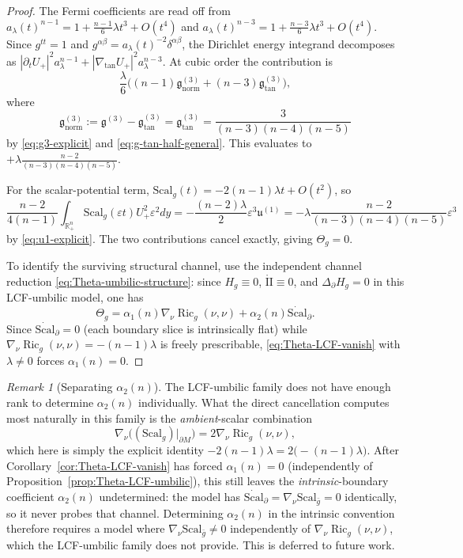 \documentclass[11pt,reqno,a4paper]{amsart}
\newcommand{\R}{\mathbb{R}}
\DeclareMathOperator{\Ric}{Ric}
\numberwithin{equation}{section}
\theoremstyle{plain}
\newcommand{\Scal}{\mathrm{Scal}}
\theoremstyle{remark}
\newtheorem{remark}[theorem]{Remark}
\theoremstyle{plain}
\begin{document}
\begin{proof}
The Fermi coefficients are read off from
$a_\lambda(t)^{n-1}=1+\frac{n-1}{6}\lambda t^3+O(t^4)$ and
$a_\lambda(t)^{n-3}=1+\frac{n-3}{6}\lambda t^3+O(t^4)$.
Since $g^{tt}=1$ and $g^{\alpha\beta}=a_\lambda(t)^{-2}\delta^{\alpha\beta}$,
the Dirichlet energy integrand decomposes as
$|\partial_t U_+|^2 a_\lambda^{n-1}+|\nabla_{\tan}U_+|^2 a_\lambda^{n-3}$.
At cubic order the contribution is
\[
\frac{\lambda}{6}\Big((n-1)\mathfrak g^{(3)}_{\mathrm{norm}}+(n-3)\mathfrak g^{(3)}_{\tan}\Big),
\]
where
\[
\mathfrak g^{(3)}_{\mathrm{norm}}:=\mathfrak g^{(3)}-\mathfrak g^{(3)}_{\tan}=\mathfrak g^{(3)}_{\tan}=\frac{3}{(n-3)(n-4)(n-5)}
\]
by \eqref{eq:g3-explicit} and \eqref{eq:g-tan-half-general}. This evaluates to
$+\lambda\frac{n-2}{(n-3)(n-4)(n-5)}$.

For the scalar-potential term, $\Scal_g(t)=-2(n-1)\lambda t+O(t^2)$, so
\[
\frac{n-2}{4(n-1)}\int_{\R^n_+}\Scal_g(\varepsilon t)U_+^2\varepsilon^{2}dy
=
-\frac{(n-2)\lambda}{2}\varepsilon^3\mathfrak u^{(1)}
=
-\lambda\frac{n-2}{(n-3)(n-4)(n-5)}\varepsilon^3
\]
by \eqref{eq:u1-explicit}. The two contributions cancel exactly, giving $\Theta_g=0$.

To identify the surviving structural channel, use the independent channel
reduction \eqref{eq:Theta-umbilic-structure}: since
$H_g\equiv0$, $\mathring{\mathrm{II}}\equiv0$, and $\Delta_\partial H_g=0$
in this LCF-umbilic model, one has
\[
\Theta_g=\alpha_1(n)\nabla_\nu\Ric_g(\nu,\nu)+\alpha_2(n)\dot{\Scal}_\partial.
\]
Since $\dot{\Scal}_\partial=0$ (each boundary slice is intrinsically flat) while
$\nabla_\nu\Ric_g(\nu,\nu)=-(n-1)\lambda$ is freely prescribable, \eqref{eq:Theta-LCF-vanish}
with $\lambda\neq0$ forces $\alpha_1(n)=0$.
\end{proof}

\begin{remark}[Separating $\alpha_2(n)$]\label{rem:alpha2-separation}
The LCF-umbilic family does not have enough rank to determine $\alpha_2(n)$ individually.
What the direct cancellation computes most naturally in this family is the \emph{ambient}-scalar combination
\[
\nabla_\nu\bigl((\Scal_g)|_{\partial M}\bigr)=2\nabla_\nu\Ric_g(\nu,\nu),
\]
which here is simply the explicit identity $-2(n-1)\lambda=2\bigl(-(n-1)\lambda\bigr)$. After Corollary~\ref{cor:Theta-LCF-vanish}
has forced $\alpha_1(n)=0$ (independently of Proposition~\ref{prop:Theta-LCF-umbilic}), this still leaves the
\emph{intrinsic}-boundary coefficient $\alpha_2(n)$ undetermined: the model has
$\dot{\Scal}_\partial=\nabla_\nu\Scal_{\bar g}=0$ identically, so it never probes that channel.
Determining $\alpha_2(n)$ in the intrinsic convention therefore requires a model where
$\nabla_\nu\Scal_{\bar g}\neq0$ independently of $\nabla_\nu\Ric_g(\nu,\nu)$, which the
LCF-umbilic family does not provide. This is deferred to future work.
\end{remark}
\end{document}
